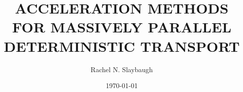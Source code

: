 

\clearpage{}  %



\title{ACCELERATION METHODS FOR MASSIVELY PARALLEL DETERMINISTIC TRANSPORT}
\author{Rachel N. Slaybaugh}
\date{\today}
\thesis
\maketitle

\copyrightpage


